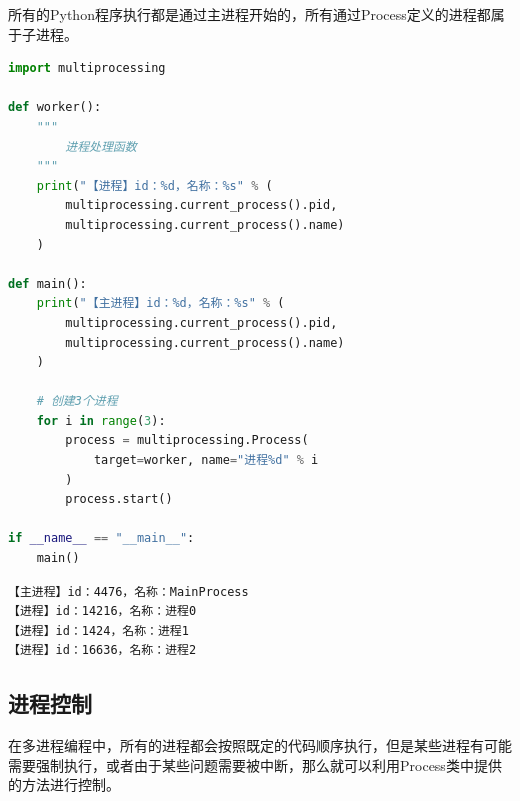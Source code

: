 所有的Python程序执行都是通过主进程开始的，所有通过Process定义的进程都属于子进程。\\


\begin{lstlisting}[language=Python]
import multiprocessing

def worker():
	"""
		进程处理函数
	"""
	print("【进程】id：%d，名称：%s" % (
		multiprocessing.current_process().pid,
		multiprocessing.current_process().name)
	)

def main():
	print("【主进程】id：%d，名称：%s" % (
		multiprocessing.current_process().pid,
		multiprocessing.current_process().name)
	)

	# 创建3个进程
	for i in range(3):
		process = multiprocessing.Process(
			target=worker, name="进程%d" % i
		)
		process.start()

if __name__ == "__main__":
	main()
\end{lstlisting}

\begin{tcolorbox}
	\begin{verbatim}
【主进程】id：4476，名称：MainProcess
【进程】id：14216，名称：进程0
【进程】id：1424，名称：进程1
【进程】id：16636，名称：进程2
\end{verbatim}
\end{tcolorbox}

\vspace{0.5cm}

\subsection{进程控制}

在多进程编程中，所有的进程都会按照既定的代码顺序执行，但是某些进程有可能需要强制执行，或者由于某些问题需要被中断，那么就可以利用Process类中提供的方法进行控制。

\begin{table}[H]
	\centering
	\caption{进程控制}
\end{table}

